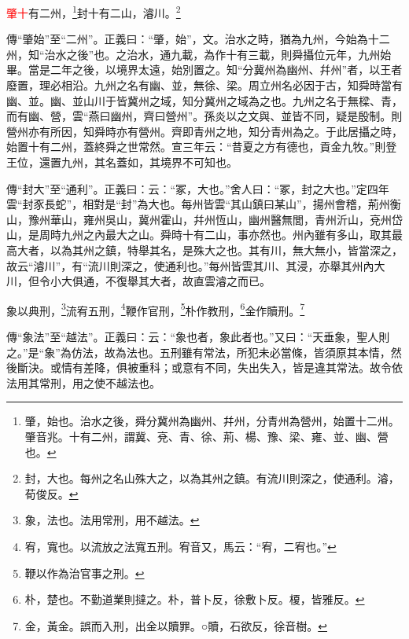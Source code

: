 \textcolor{red}{肇十}有二州，\footnote{肇，始也。治水之後，舜分冀州為幽州、幷州，分青州為營州，始置十二州。肇音兆。十有二州，謂冀、兗、青、徐、荊、楊、豫、梁、雍、並、幽、營也。}封十有二山，濬川。\footnote{封，大也。每州之名山殊大之，以為其州之鎮。有流川則深之，使通利。濬，荀俊反。}

{\noindent\zhuan{}\fzbyks 傳“肇始”至“二州”。正義曰：“肇，始”，文。治水之時，猶為九州，今始為十二州，知“治水之後”也。之治水，通九載，為作十有三載，則舜攝位元年，九州始畢。當是二年之後，以境界太遠，始別置之。知“分冀州為幽州、幷州”者，以王者廢置，理必相沿。九州之名有幽、並，無徐、梁。周立州名必因于古，知舜時當有幽、並。幽、並山川于皆冀州之域，知分冀州之域為之也。九州之名于無樑、青，而有幽、營，雲“燕曰幽州，齊曰營州”。孫炎以之文與、並皆不同，疑是殷制。則營州亦有所因，知舜時亦有營州。齊即青州之地，知分青州為之。于此居攝之時，始置十有二州，蓋終舜之世常然。宣三年云：“昔夏之方有德也，貢金九牧。”則登王位，還置九州，其名蓋如，其境界不可知也。 \par}

{\noindent\zhuan{}\fzbyks 傳“封大”至“通利”。正義曰：云：“冢，大也。”舍人曰：“冢，封之大也。”定四年雲“封豕長蛇”，相對是“封”為大也。每州皆雲“其山鎮曰某山”，揚州會稽，荊州衡山，豫州華山，雍州吳山，冀州霍山，幷州恆山，幽州醫無閭，青州沂山，兗州岱山，是周時九州之內最大之山。舜時十有二山，事亦然也。州內雖有多山，取其最高大者，以為其州之鎮，特舉其名，是殊大之也。其有川，無大無小，皆當深之，故云“濬川”，有“流川則深之，使通利也。”每州皆雲其川、其浸，亦舉其州內大川，但令小大俱通，不復舉其大者，故直雲濬之而已。 \par}

象以典刑，\footnote{象，法也。法用常刑，用不越法。}流宥五刑，\footnote{宥，寬也。以流放之法寬五刑。宥音又，馬云：“宥，二宥也。”}鞭作官刑，\footnote{鞭以作為治官事之刑。}朴作教刑，\footnote{朴，楚也。不勤道業則撻之。朴，普卜反，徐敷卜反。榎，皆雅反。}金作贖刑。\footnote{金，黃金。誤而入刑，出金以贖罪。○贖，石欲反，徐音樹。}

{\noindent\zhuan{}\fzbyks 傳“象法”至“越法”。正義曰：云：“象也者，象此者也。”又曰：“天垂象，聖人則之。”是“象”為仿法，故為法也。五刑雖有常法，所犯未必當條，皆須原其本情，然後斷決。或情有差降，俱被重科；或意有不同，失出失入，皆是違其常法。故令依法用其常刑，用之使不越法也。 \par}

